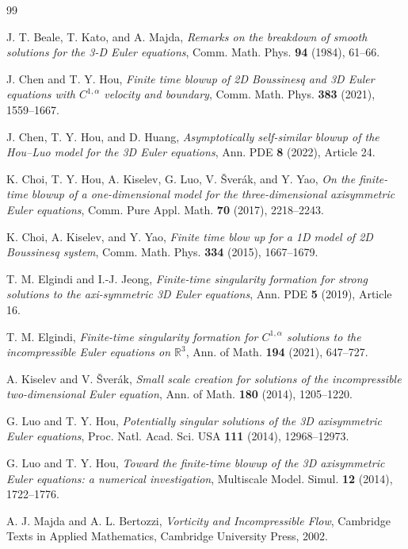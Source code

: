 \documentclass[11pt]{amsart}
\begin{document}
\begin{thebibliography}{99}

J. T. Beale, T. Kato, and A. Majda,
\emph{Remarks on the breakdown of smooth solutions for the 3-D Euler equations},
Comm. Math. Phys. \textbf{94} (1984), 61--66.

J. Chen and T. Y. Hou,
\emph{Finite time blowup of 2D Boussinesq and 3D Euler equations with \(C^{1,\alpha}\) velocity and boundary},
Comm. Math. Phys. \textbf{383} (2021), 1559--1667.

J. Chen, T. Y. Hou, and D. Huang,
\emph{Asymptotically self-similar blowup of the Hou--Luo model for the 3D Euler equations},
Ann. PDE \textbf{8} (2022), Article 24.

K. Choi, T. Y. Hou, A. Kiselev, G. Luo, V. \v Sver\'ak, and Y. Yao,
\emph{On the finite-time blowup of a one-dimensional model for the three-dimensional axisymmetric Euler equations},
Comm. Pure Appl. Math. \textbf{70} (2017), 2218--2243.

K. Choi, A. Kiselev, and Y. Yao,
\emph{Finite time blow up for a 1D model of 2D Boussinesq system},
Comm. Math. Phys. \textbf{334} (2015), 1667--1679.

T. M. Elgindi and I.-J. Jeong,
\emph{Finite-time singularity formation for strong solutions to the axi-symmetric 3D Euler equations},
Ann. PDE \textbf{5} (2019), Article 16.

T. M. Elgindi,
\emph{Finite-time singularity formation for \(C^{1,\alpha}\) solutions to the incompressible Euler equations on \(\mathbb R^3\)},
Ann. of Math. \textbf{194} (2021), 647--727.

A. Kiselev and V. \v Sver\'ak,
\emph{Small scale creation for solutions of the incompressible two-dimensional Euler equation},
Ann. of Math. \textbf{180} (2014), 1205--1220.

G. Luo and T. Y. Hou,
\emph{Potentially singular solutions of the 3D axisymmetric Euler equations},
Proc. Natl. Acad. Sci. USA \textbf{111} (2014), 12968--12973.

G. Luo and T. Y. Hou,
\emph{Toward the finite-time blowup of the 3D axisymmetric Euler equations: a numerical investigation},
Multiscale Model. Simul. \textbf{12} (2014), 1722--1776.

A. J. Majda and A. L. Bertozzi,
\emph{Vorticity and Incompressible Flow},
Cambridge Texts in Applied Mathematics, Cambridge University Press, 2002.


\end{thebibliography}
\end{document}
